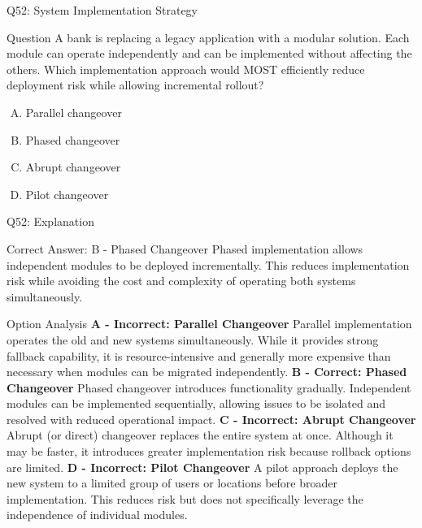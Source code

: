 \documentclass{beamer}
\begin{document}
	
	\begin{frame}{Q52: System Implementation Strategy} \begin{block}{Question} A bank is replacing a legacy application with a modular solution. Each module can operate independently and can be implemented without affecting the others. Which implementation approach would MOST efficiently reduce deployment risk while allowing incremental rollout? \end{block} \begin{enumerate}[(A)] \item Parallel changeover \item Phased changeover \item Abrupt changeover \item Pilot changeover \end{enumerate} \end{frame} \begin{frame}[shrink=10]{Q52: Explanation} \footnotesize \begin{block}{Correct Answer: B - Phased Changeover} Phased implementation allows independent modules to be deployed incrementally. This reduces implementation risk while avoiding the cost and complexity of operating both systems simultaneously. \end{block} \begin{block}{Option Analysis} \textbf{A - Incorrect: Parallel Changeover} Parallel implementation operates the old and new systems simultaneously. While it provides strong fallback capability, it is resource-intensive and generally more expensive than necessary when modules can be migrated independently. \vspace{0.15cm} \textbf{B - Correct: Phased Changeover} Phased changeover introduces functionality gradually. Independent modules can be implemented sequentially, allowing issues to be isolated and resolved with reduced operational impact. \vspace{0.15cm} \textbf{C - Incorrect: Abrupt Changeover} Abrupt (or direct) changeover replaces the entire system at once. Although it may be faster, it introduces greater implementation risk because rollback options are limited. \vspace{0.15cm} \textbf{D - Incorrect: Pilot Changeover} A pilot approach deploys the new system to a limited group of users or locations before broader implementation. This reduces risk but does not specifically leverage the independence of individual modules. \end{block} \end{frame}
	
\end{document}
